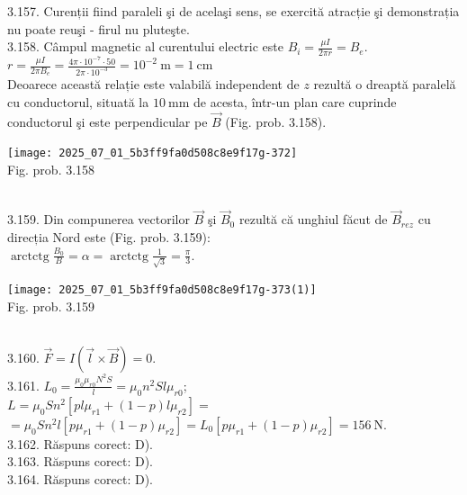 \begin{center}
3.157. Curenții fiind paraleli şi de acelaşi sens, se exercită atracție şi demonstrația nu poate reuşi - firul nu pluteşte.\\

3.158. Câmpul magnetic al curentului electric este $B_{i}=\frac{\mu I}{2 \pi r}=B_{e}$.\\ $r=\frac{\mu I}{2 \pi B_{e}}=\frac{4 \pi \cdot 10^{-7} \cdot 50}{2 \pi \cdot 10^{-3}}=10^{-2} \mathrm{~m}=1 \mathrm{~cm}$\\ Deoarece această relație este valabilă independent de $z$ rezultă o dreaptă paralelă cu conductorul, situată la $10 \mathrm{~mm}$ de acesta, într-un plan care cuprinde conductorul şi este perpendicular pe $\vec{B}$ (Fig. prob. 3.158).\\ \begin{center} \texttt{[image: 2025\_07\_01\_5b3ff9fa0d508c8e9f17g-372]}\\ Fig. prob. 3.158 \end{center}\\

3.159. Din compunerea vectorilor $\vec{B}$ şi $\vec{B}_{0}$ rezultă că unghiul făcut de $\vec{B}_{r e z}$ cu direcția Nord este (Fig. prob. 3.159):\\ $\operatorname{arctctg} \frac{B_{0}}{B}=\alpha=\operatorname{arctctg} \frac{1}{\sqrt{3}}=\frac{\pi}{3}$.\\ \begin{center} \texttt{[image: 2025\_07\_01\_5b3ff9fa0d508c8e9f17g-373(1)]}\\ Fig. prob. 3.159 \end{center}\\

3.160. $\vec{F}=I(\vec{l} \times \vec{B})=0$.\\

3.161. $L_{0}=\frac{\mu_{0} \mu_{r 0} N^{2} S}{l}=\mu_{0} n^{2} S l \mu_{r 0}$;\\ $L =\mu_{0} S n^{2}\left[p l \mu_{r 1}+(1-p) l \mu_{r 2}\right]= $\\$=\mu_{0} S n^{2} l\left[p \mu_{r 1}+(1-p) \mu_{r 2}\right]=L_{0}\left[p \mu_{r 1}+(1-p) \mu_{r 2}\right]=156 \mathrm{~N}$.\\

3.162. Răspuns corect: D).\\

3.163. Răspuns corect: D).\\

3.164. Răspuns corect: D).\\


\end{center}
